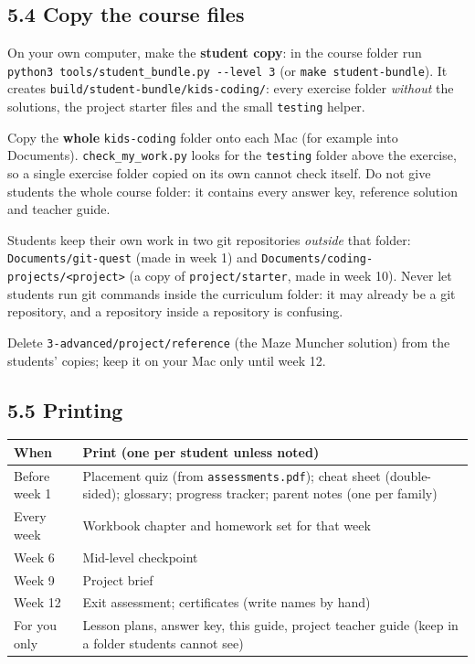 \documentclass[level=3,teacher]{kidscode}
\begin{document}
\subsection{5.4 Copy the course files}
\begin{checklist}
  \item On your own computer, make the \textbf{student copy}: in the course folder run
        \texttt{python3 tools/student\_bundle.py -{}-level 3} (or \texttt{make student-bundle}). It creates
        \texttt{build/\allowbreak student-bundle/\allowbreak kids-coding/}: every exercise folder \emph{without} the solutions,
        the project starter files and the small \texttt{testing} helper.
  \item Copy the \textbf{whole} \texttt{kids-coding} folder onto each Mac (for example into Documents).
        \texttt{check\_my\_work.py} looks for the \texttt{testing} folder above the exercise, so a single
        exercise folder copied on its own cannot check itself. Do not give students the whole course
        folder: it contains every answer key, reference solution and teacher guide.
  \item Students keep their own work in two git repositories \emph{outside} that folder:
        \texttt{Documents/git-quest} (made in week 1) and
        \texttt{Documents/coding-projects/<project>} (a copy of \texttt{project/starter}, made in
        week 10). Never let students run git commands inside the curriculum folder: it may already
        be a git repository, and a repository inside a repository is confusing.
  \item Delete \texttt{3-advanced/project/reference} (the Maze Muncher solution) from the
        students' copies; keep it on your Mac only until week 12.
\end{checklist}

\subsection{5.5 Printing}
\begin{tabularx}{\linewidth}{@{}>{\raggedright\arraybackslash}p{4.8cm}X@{}}
\toprule
\rowcolor{kcaccent!15} When & Print (one per student unless noted)\\ \midrule
Before week 1 & Placement quiz (from \texttt{assessments.pdf}); cheat sheet (double-sided); glossary;
progress tracker; parent notes (one per family)\\
Every week & Workbook chapter and homework set for that week\\
Week 6 & Mid-level checkpoint\\
Week 9 & Project brief\\
Week 12 & Exit assessment; certificates (write names by hand)\\
For you only & Lesson plans, answer key, this guide, project teacher guide (keep in a folder
students cannot see)\\
\bottomrule
\end{tabularx}
\end{document}
